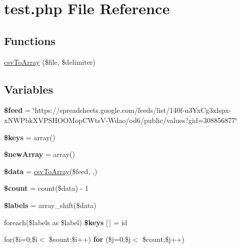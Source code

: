 \hypertarget{test_8php}{}\section{test.\+php File Reference}
\label{test_8php}
\subsection*{Functions}
\begin{DoxyCompactItemize}
\item 
\hyperlink{test_8php_aa8908c82e8e46a1c95f377e66dc6c40b}{csv\+To\+Array} (\$file, \$delimiter)
\end{DoxyCompactItemize}
\subsection*{Variables}
\begin{DoxyCompactItemize}
\item 
{\bfseries \$feed} = \char`\"{}https\+://spreadsheets.\+google.\+com/feeds/list/140f-\/u3\+Yx\+Cg3xlspx-\/x\+N\+W\+Pbk\+X\+V\+P\+S\+H\+O\+O\+Mop\+C\+Wts\+V-\/\+Wdao/od6/public/values?gid=308856877\char`\"{}\hypertarget{test_8php_a0c64e1f194986e6f51a67a8144fa305f}{}\label{test_8php_a0c64e1f194986e6f51a67a8144fa305f}

\item 
{\bfseries \$keys} = array()\hypertarget{test_8php_af20635b6c08e03bfee9e3fc036fa80f3}{}\label{test_8php_af20635b6c08e03bfee9e3fc036fa80f3}

\item 
{\bfseries \$new\+Array} = array()\hypertarget{test_8php_a8377ba404a557d195a485b85b627c6fa}{}\label{test_8php_a8377ba404a557d195a485b85b627c6fa}

\item 
{\bfseries \$data} = \hyperlink{test_8php_aa8908c82e8e46a1c95f377e66dc6c40b}{csv\+To\+Array}(\$feed, \textquotesingle{},\textquotesingle{})\hypertarget{test_8php_a6efc15b5a2314dd4b5aaa556a375c6d6}{}\label{test_8php_a6efc15b5a2314dd4b5aaa556a375c6d6}

\item 
{\bfseries \$count} = count(\$data) -\/ 1\hypertarget{test_8php_af789423037bbc89dc7c850e761177570}{}\label{test_8php_af789423037bbc89dc7c850e761177570}

\item 
{\bfseries \$labels} = array\+\_\+shift(\$data)\hypertarget{test_8php_a00fa4df95d1b7c3dd9a2321448e90ba9}{}\label{test_8php_a00fa4df95d1b7c3dd9a2321448e90ba9}

\item 
foreach(\$labels as \$label) {\bfseries \$keys} \mbox{[}$\,$\mbox{]} = \textquotesingle{}id\textquotesingle{}\hypertarget{test_8php_a524baf5e8d5195a196fa969b2e455569}{}\label{test_8php_a524baf5e8d5195a196fa969b2e455569}

\item 
for(\$i=0;\$i$<$ \$count;\$i++) {\bfseries for} (\$j=0;\$j$<$ \$count;\$j++)\hypertarget{test_8php_a66d043b1aeb98b3819bd91c7c9c4bd7c}{}\label{test_8php_a66d043b1aeb98b3819bd91c7c9c4bd7c}

\end{DoxyCompactItemize}


